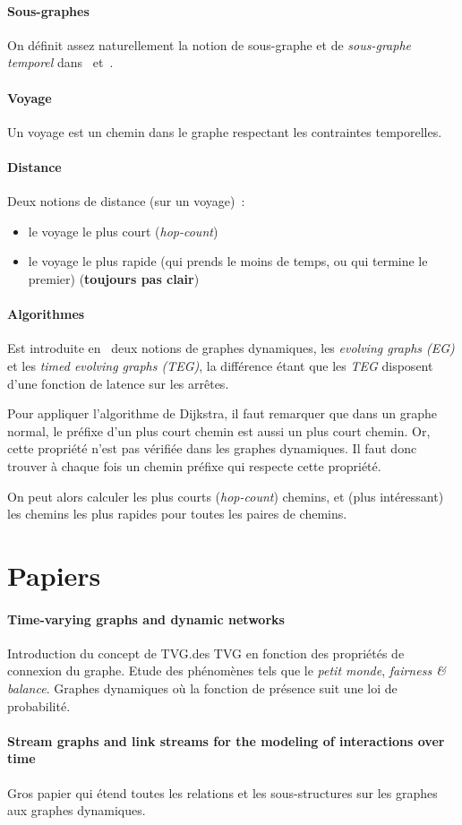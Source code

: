 \documentclass[12pt,a4paper]{article}
\begin{document}
\paragraph{Sous-graphes}
On définit assez naturellement la notion de sous-graphe et de
\textit{sous-graphe temporel} dans~\cite{casteigts2012time}
et~\cite{latapy2017stream}.

\paragraph{Voyage}
Un voyage est un chemin dans le graphe respectant les contraintes
temporelles.

\paragraph{Distance}
Deux notions de distance (sur un voyage)~:
\begin{itemize}
\item le voyage le plus court (\textit{hop-count})
\item le voyage le plus rapide (qui prends le moins de temps, ou qui
  termine le premier) (\textbf{toujours pas clair})
\end{itemize}

\paragraph{Algorithmes}
Est introduite en~\cite{xuan2003computing} deux notions de graphes
dynamiques, les \textit{evolving graphs (EG)} et les \textit{timed
  evolving graphs (TEG)}, la différence étant que les \textit{TEG}
disposent d'une fonction de latence sur les arrêtes.

Pour appliquer l'algorithme de Dijkstra, il faut remarquer que dans un
graphe normal, le préfixe d'un plus court chemin est aussi un plus
court chemin. Or, cette propriété n'est pas vérifiée dans les graphes
dynamiques. Il faut donc trouver à chaque fois un chemin préfixe qui
respecte cette propriété.

On peut alors calculer les plus courts (\textit{hop-count}) chemins,
et (plus intéressant) les chemins les plus rapides pour toutes les
paires de chemins.

\section{Papiers}

\paragraph{Time-varying graphs and dynamic networks}
Introduction du concept de TVG.\@Classification des TVG en fonction
des propriétés de connexion du graphe. Etude des phénomènes tels que
le \textit{petit monde}, \textit{fairness \& balance}. Graphes
dynamiques où la fonction de présence suit une loi de probabilité.

\paragraph{Stream graphs and link streams for the modeling of
  interactions over time}
Gros papier qui étend toutes les relations et les sous-structures sur
les graphes aux graphes dynamiques.

% 
% 
\printbibliography
\end{document}
